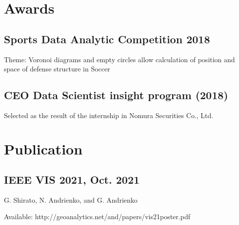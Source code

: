 \section{Awards}

\subsection{Sports Data Analytic Competition 2018}
Theme: Voronoi diagrams and empty circles allow calculation of position and space of defense structure in Soccer
\sectionsep

\subsection{CEO Data Scientist insight program (2018)}
Selected as the result of the internship in Nomura Securities Co., Ltd.
\sectionsep


\section{Publication}
\subsection{IEEE VIS 2021, Oct. 2021}
G. Shirato, N. Andrienko, and G. Andrienko

Available: http://geoanalytics.net/and/papers/vis21poster.pdf